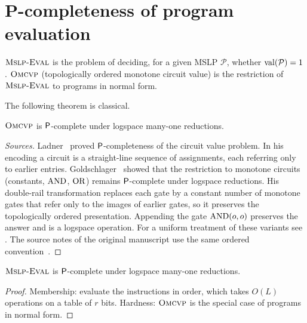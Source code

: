 \section{P-completeness of program evaluation}\label{sec:pcomplete}

\begin{definition}\label{def:eval}
$\textsc{Mslp-Eval}$ is the problem of deciding, for a given MSLP $\mathcal P$, whether $\operatorname{val}(\mathcal P)=1$.
$\textsc{Omcvp}$ (topologically ordered monotone circuit value) is the restriction of $\textsc{Mslp-Eval}$ to programs
in normal form.
\end{definition}

The following theorem is classical.

\begin{theorem}\label{thm:mcvp}
$\textsc{Omcvp}$ is $\mathsf{P}$-complete under logspace many-one reductions.
\end{theorem}

\begin{proof}[Sources]
Ladner~\cite{Lad75} proved $\mathsf{P}$-completeness of the circuit value problem. In his encoding a
circuit is a straight-line sequence of assignments, each referring only to earlier entries.
Goldschlager~\cite{Gol77} showed that the restriction to monotone circuits (constants, $\operatorname{AND}$, $\operatorname{OR}$)
remains $\mathsf{P}$-complete under logspace reductions. His double-rail transformation replaces each
gate by a constant number of monotone gates that refer only to the images of earlier gates, so it
preserves the topologically ordered presentation. Appending the gate $\operatorname{AND}(o,o)$ preserves the
answer and is a logspace operation. For a uniform treatment of these variants see
\cite[Appendix~A.1]{GHR95}. The source notes of the original manuscript use the same ordered
convention~\cite{Src}.
\end{proof}

\begin{corollary}\label{cor:evalcomplete}
$\textsc{Mslp-Eval}$ is $\mathsf{P}$-complete under logspace many-one reductions.
\end{corollary}

\begin{proof}
Membership: evaluate the instructions in order, which takes $O(L)$ operations on a table of $r$
bits. Hardness: $\textsc{Omcvp}$ is the special case of programs in normal form.
\end{proof}

